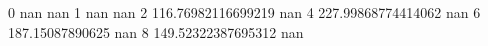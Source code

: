 0 nan nan
1 nan nan
2 116.76982116699219 nan
4 227.99868774414062 nan
6 187.15087890625 nan
8 149.52322387695312 nan
